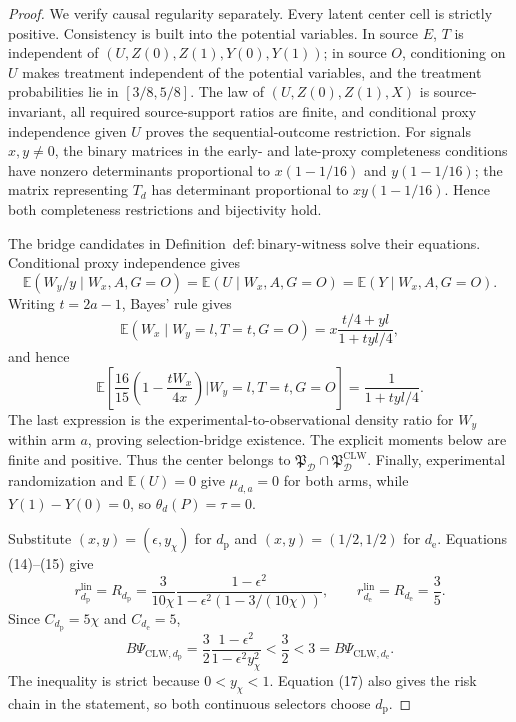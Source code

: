 \documentclass{article}
\begin{document}
\begin{proof}
We verify causal regularity separately.  Every latent center cell is strictly positive.  Consistency is built into the potential variables.  In source \(E\), \(T\) is independent of \((U,Z(0),Z(1),Y(0),Y(1))\); in source \(O\), conditioning on \(U\) makes treatment independent of the potential variables, and the treatment probabilities lie in \([3/8,5/8]\).  The law of \((U,Z(0),Z(1),X)\) is source-invariant, all required source-support ratios are finite, and conditional proxy independence given \(U\) proves the sequential-outcome restriction.  For signals \(x,y\ne0\), the binary matrices in the early- and late-proxy completeness conditions have nonzero determinants proportional to \(x(1-1/16)\) and \(y(1-1/16)\); the matrix representing \(T_d\) has determinant proportional to \(xy(1-1/16)\).  Hence both completeness restrictions and bijectivity hold.

The bridge candidates in Definition~\(\mathrm{def{:}binary\text{-}witness}\) solve their equations.  Conditional proxy independence gives
\[
 \mathbb E(W_y/y\mid W_x,A,G=O)
 =\mathbb E(U\mid W_x,A,G=O)=\mathbb E(Y\mid W_x,A,G=O).
\]
Writing \(t=2a-1\), Bayes' rule gives
\[
 \mathbb E(W_x\mid W_y=l,T=t,G=O)
 =x\frac{t/4+yl}{1+tyl/4},
\]
and hence
\[
 \mathbb E\!\left[
 \frac{16}{15}\left(1-\frac{tW_x}{4x}\right)
 \mathrel{\Big|}W_y=l,T=t,G=O\right]
 =\frac1{1+tyl/4}.                                        \tag{16}
\]
The last expression is the experimental-to-observational density ratio for \(W_y\) within arm \(a\), proving selection-bridge existence.  The explicit moments below are finite and positive.  Thus the center belongs to \(\mathfrak P_{\mathcal D}\cap\mathfrak P_{\mathcal D}^{\mathrm{CLW}}\).  Finally, experimental randomization and \(\mathbb E(U)=0\) give \(\mu_{d,a}=0\) for both arms, while \(Y(1)-Y(0)=0\), so \(\theta_d(P)=\tau=0\).

Substitute \((x,y)=(\epsilon,y_\chi)\) for \(d_{\mathrm p}\) and \((x,y)=(1/2,1/2)\) for \(d_{\mathrm e}\).  Equations (14)--(15) give
\[
 r_{d_{\mathrm p}}^{\mathrm{lin}}=R_{d_{\mathrm p}}
 =\frac{3}{10\chi}
 \frac{1-\epsilon^2}{1-\epsilon^2(1-3/(10\chi))},
 \qquad
 r_{d_{\mathrm e}}^{\mathrm{lin}}=R_{d_{\mathrm e}}=\frac35. \tag{17}
\]
Since \(C_{d_{\mathrm p}}=5\chi\) and \(C_{d_{\mathrm e}}=5\),
\[
 B\Psi_{\mathrm{CLW},d_{\mathrm p}}
 =\frac32\frac{1-\epsilon^2}{1-\epsilon^2y_\chi^2}
 <\frac32<3=B\Psi_{\mathrm{CLW},d_{\mathrm e}}.           \tag{18}
\]
The inequality is strict because \(0<y_\chi<1\).  Equation (17) also gives the risk chain in the statement, so both continuous selectors choose \(d_{\mathrm p}\).


\end{proof}
\end{document}
